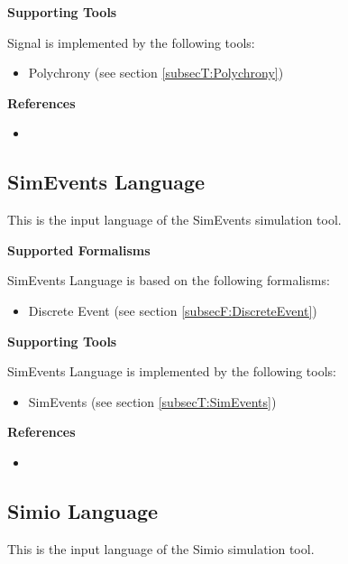 \textbf{Supporting Tools}

Signal is implemented by the following tools:
\begin{itemize}
	\item Polychrony (see section \ref{subsecT:Polychrony})
\end{itemize}


\textbf{References}
\begin{itemize}
	
\item {}
\end{itemize}



\subsection{SimEvents Language}
\label{subsecL:SimEventsLanguage}


This is the input language of the SimEvents simulation tool.

\textbf{Supported Formalisms}

SimEvents Language is based on the following formalisms:
\begin{itemize}
	\item Discrete Event (see section \ref{subsecF:DiscreteEvent})
\end{itemize}


\textbf{Supporting Tools}

SimEvents Language is implemented by the following tools:
\begin{itemize}
	\item SimEvents (see section \ref{subsecT:SimEvents})
\end{itemize}


\textbf{References}
\begin{itemize}
	
\item {}
\end{itemize}



\subsection{Simio Language}
\label{subsecL:SimioLanguage}


This is the input language of the Simio simulation tool.

